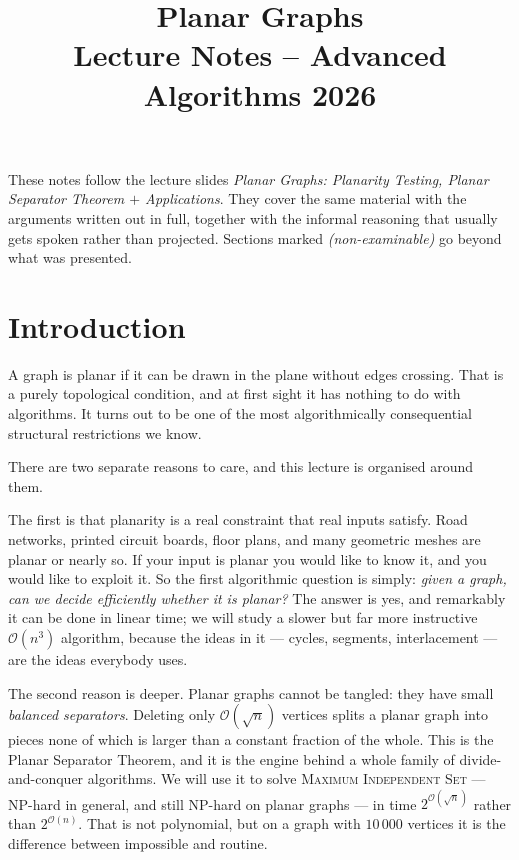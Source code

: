 \documentclass[11pt,a4paper]{article}
\title{\bfseries Planar Graphs\\[0.4em]
       \large Lecture Notes -- Advanced Algorithms 2026}
\author{}
\date{}
\theoremstyle{plain}
\theoremstyle{definition}
\theoremstyle{remark}
\newcommand{\bigoh}[1]{\mathcal{O}\!\left(#1\right)}
\begin{document}
\maketitle
\vspace{-3.5em}

\begin{center}
\begin{minipage}{0.86\textwidth}
\small
These notes follow the lecture slides \emph{Planar Graphs: Planarity Testing,
Planar Separator Theorem $+$ Applications}. They cover the same material with
the arguments written out in full, together with the informal reasoning that
usually gets spoken rather than projected. Sections marked
\emph{(non-examinable)} go beyond what was presented.
\end{minipage}
\end{center}
\vspace{1em}

\tableofcontents
\bigskip

\section{Introduction}

A graph is planar if it can be drawn in the plane without edges crossing.
That is a purely topological condition, and at first sight it has nothing to
do with algorithms. It turns out to be one of the most algorithmically
consequential structural restrictions we know.

There are two separate reasons to care, and this lecture is organised around
them.

The first is that planarity is a real constraint that real inputs satisfy.
Road networks, printed circuit boards, floor plans, and many geometric meshes
are planar or nearly so. If your input is planar you would like to know it,
and you would like to exploit it. So the first algorithmic question is simply:
\emph{given a graph, can we decide efficiently whether it is planar?} The
answer is yes, and remarkably it can be done in linear time; we will study a
slower but far more instructive $\bigoh{n^3}$ algorithm, because the ideas in
it --- cycles, segments, interlacement --- are the ideas everybody uses.

The second reason is deeper. Planar graphs cannot be tangled: they have small
\emph{balanced separators}. Deleting only $\bigoh{\sqrt{n}}$ vertices splits a
planar graph into pieces none of which is larger than a constant fraction of
the whole. This is the Planar Separator Theorem, and it is the engine behind a
whole family of divide-and-conquer algorithms. We will use it to solve
\textsc{Maximum Independent Set} --- NP-hard in general, and still NP-hard on
planar graphs --- in time $2^{\bigoh{\sqrt{n}}}$ rather than $2^{\bigoh{n}}$.
That is not polynomial, but on a graph with $10\,000$ vertices it is the
difference between impossible and routine.
\end{document}
